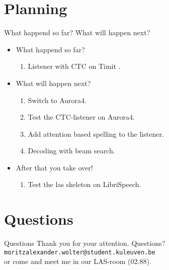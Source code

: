\documentclass{beamer}
\begin{document}
\section{Planning}
\begin{frame}{What happend so far? What will happen next?}
\begin{itemize}
\item What happend so far?
	\begin{enumerate}
		\item Listener with CTC on Timit .
	\end{enumerate}
\item What will happen next?
		\begin{enumerate}
			\item Switch to Aurora4.
			\item Test the CTC-listener on Aurora4. 
			\item Add attention based spelling to the listener.
			\item Decoding with beam search.
		\end{enumerate}
\item After that you take over!		
	 \begin{enumerate}
	 	\item Test the las skeleton on LibriSpeech.
	 \end{enumerate}
\end{itemize}
\end{frame}


\section{Questions}
\begin{frame}{Questions}
	Thank you for your attention. Questions? \\
	\texttt{moritzalexander.wolter@student.kuleuven.be} \\
	or come and meet me in our LAS-room (02.88).
\end{frame}
\end{document}
